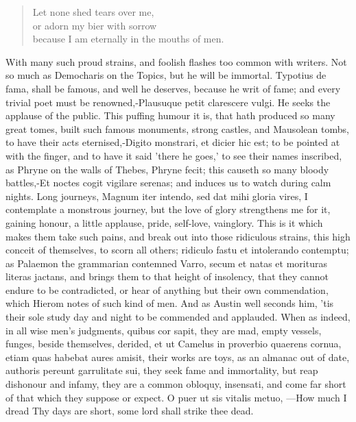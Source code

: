 {\settowidth{\versewidth}{Let none shed tears over me, or adorn my bier with sorrow}
\begin{verse}
Let none shed tears over me,\\
or adorn my bier with sorrow\\
because I am eternally in the mouths of men.
\end{verse}

With many such proud strains, and foolish flashes too common with writers. Not so much as Democharis on
the  Topics, but he will be immortal. Typotius de fama, shall be
famous, and well he deserves, because he writ of fame; and every
trivial poet must be renowned,-Plausuque petit clarescere vulgi. He
seeks the applause of the public. This puffing humour it is, that hath
produced so many great tomes, built such famous monuments, strong
castles, and Mausolean tombs, to have their acts eternised,-Digito
monstrari, et dicier hic est; to be pointed at with the finger, and to
have it said 'there he goes,' to see their names inscribed, as Phryne
on the walls of Thebes, Phryne fecit; this causeth so many bloody
battles,-Et noctes cogit vigilare serenas; and induces us to watch
during calm nights. Long journeys, Magnum iter intendo, sed dat mihi
gloria vires, I contemplate a monstrous journey, but the love of glory
strengthens me for it, gaining honour, a little applause, pride,
self-love, vainglory. This is it which makes them take such pains, and
break out into those ridiculous strains, this high conceit of
themselves, to scorn all others; ridiculo fastu et intolerando
contemptu; as Palaemon the grammarian contemned Varro, secum et
natas et morituras literas jactans, and brings them to that height of
insolency, that they cannot endure to be contradicted, or hear of
anything but their own commendation, which Hierom notes of such kind of
men. And as Austin well seconds him, 'tis their sole study day
and night to be commended and applauded. When as indeed, in all wise
men's judgments, quibus cor sapit, they are mad, empty vessels,
funges, beside themselves, derided, et ut Camelus in proverbio quaerens
cornua, etiam quas habebat aures amisit, their works are toys, as
an almanac out of date, authoris pereunt garrulitate sui, they
seek fame and immortality, but reap dishonour and infamy, they are a
common obloquy, insensati, and come far short of that which they
suppose or expect. O puer ut sis vitalis metuo,
---How much I dread
Thy days are short, some lord shall strike thee dead.

}
